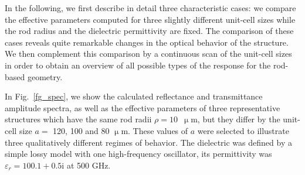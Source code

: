 
In the following, we first describe in detail three characteristic cases: we compare the effective parameters computed for three slightly different unit-cell sizes while the rod radius and the dielectric permittivity are fixed. The comparison of these cases reveals quite remarkable changes in the optical behavior of the structure. We then complement this comparison by a continuous scan of the unit-cell sizes in order to obtain an overview of all possible types of the response for the rod-based geometry.  

In Fig.~\ref{fg_spec}, we show the calculated reflectance and transmittance amplitude spectra, as well as the effective parameters of three representative structures which have the same rod radii $\rho = 10$~$\upmu$m, but they differ by the unit-cell size $a =$ 120, 100 and 80 $\upmu$m. These values of $a$ were selected to illustrate three qualitatively different regimes of behavior.  The dielectric was defined by a simple lossy model with one high-frequency oscillator, its  permittivity was $\varepsilon_r = 100.1 + 0.5\mathrm{i}$ at 500 GHz.

